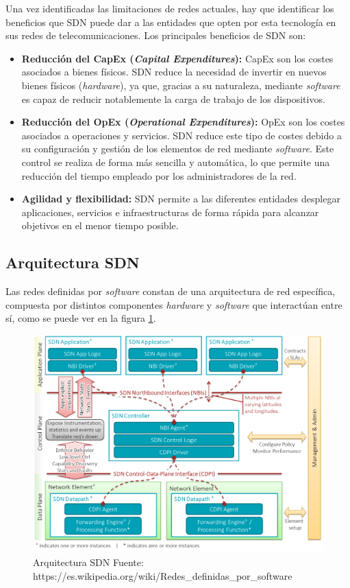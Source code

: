 Una vez identificadas las limitaciones de redes actuales, hay que identificar los beneficios que SDN puede dar a las entidades que opten por esta tecnología en sus redes de telecomunicaciones. Los principales beneficios de SDN son:

\begin{itemize}
	\item \textbf{Reducción del CapEx (\textit{Capital Expenditures}):} CapEx son los costes asociados a bienes físicos. SDN reduce la necesidad de invertir en nuevos bienes físicos (\textit{hardware}), ya que, gracias a su naturaleza, mediante \textit{software} es capaz de reducir notablemente la carga de trabajo de los dispositivos.
	
	\item \textbf{Reducción del OpEx (\textit{Operational Expenditures}):} OpEx son los costes asociados a operaciones y servicios. SDN reduce este tipo de costes debido a su configuración y gestión de los elementos de red mediante \textit{software}. Este control se realiza de forma más sencilla y automática, lo que permite una reducción del tiempo empleado por los administradores de la red.
	
	\item \textbf{Agilidad y flexibilidad:} SDN permite a las diferentes entidades desplegar aplicaciones, servicios e infraestructuras de forma rápida para alcanzar objetivos en el menor tiempo posible.
\end{itemize}

\subsection{Arquitectura SDN}

Las redes definidas por \textit{software} constan de una arquitectura de red específica, compuesta por distintos componentes \textit{hardware} y \textit{software} que interactúan entre sí, como se puede ver en la figura \ref{fig:arquitecturasdn}.
 
\begin{figure}[!ht]
	\centering
	\includegraphics[width=0.75\linewidth]{imagenes/arquitectura_sdn}
	\caption{Arquitectura SDN  Fuente: https://es.wikipedia.org/wiki/Redes\_definidas\_por\_software}
	\label{fig:arquitecturasdn}
\end{figure}

